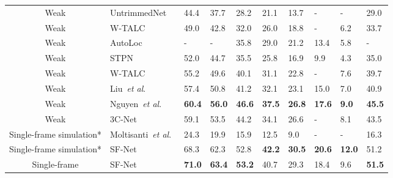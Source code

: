 \documentclass[runningheads]{llncs}
\def\etal{\emph{et al}.}
\begin{document}
\begin{table*}[!t]
{\begin{tabular}{c|l|p{0.8cm}p{0.8cm}p{0.8cm}p{0.8cm}p{0.8cm}p{0.8cm}p{0.8cm}p{0.8cm}}
				Weak                                             & UntrimmedNet~\cite{wang2017untrimmednets}            & 44.4 & 37.7 & 28.2 & 21.1 & 13.7 & -    & -    & 29.0         \\
				Weak                                             & W-TALC~\cite{ding2018weakly}                  & 49.0 & 42.8 & 32.0 & 26.0 & 18.8 & -    & 6.2  & 33.7         \\
				Weak                                             & AutoLoc~\cite{shou2018autoloc}                 & -    & -    & 35.8 & 29.0 & 21.2 & 13.4 & 5.8  & -            \\
				Weak & STPN~\cite{nguyen2018weakly}                  &  52.0    &  44.7   &     35.5  &  25.8  & 16.9  & 9.9    & 4.3   &  35.0 \\
				Weak & W-TALC~\cite{paul2018w} & 55.2 & 49.6 & 40.1 & 31.1 & 22.8 & - & 7.6 & 39.7 \\
				Weak & Liu~\etal~\cite{Liu_2019_CVPR}                 & 57.4    & 50.8    & 41.2 & 32.1 & 23.1 & 15.0 & 7.0  & 40.9            \\
				Weak                                             & Nguyen~\etal ~\cite{Nguyen_2019_ICCV}                 & \textbf{60.4}    & \textbf{56.0}    & \textbf{46.6} & \textbf{37.5} & \textbf{26.8} & \textbf{17.6} & \textbf{9.0}  & \textbf{45.5}            \\
				Weak                                             & 3C-Net~\cite{Narayan_2019_ICCV}                  & 59.1 & 53.5 & 44.2 & 34.1 & 26.6 & -    & 8.1  &  43.5            \\ \hline
				Single-frame simulation*											& Moltisanti~\etal~\cite{moltisanti2019action} 			&24.3 & 19.9 & 15.9 & 12.5 & 9.0 & -        & -      & 16.3     \\ 
				Single-frame simulation*                                            & SF-Net                    & 68.3 & 62.3 & 52.8 & \textbf{42.2} & \textbf{30.5} & \textbf{20.6} & \textbf{12.0} & 51.2    \\ 
				\hline
				Single-frame                                            & SF-Net                    & \textbf{71.0}  & \textbf{63.4} & \textbf{53.2} & 40.7 & 29.3 & 18.4 & 9.6 & \textbf{51.5} \\\hline  
		\end{tabular}}
		
		\label{tab:th14}
	\end{table*} 
	


	
	
\end{document}
